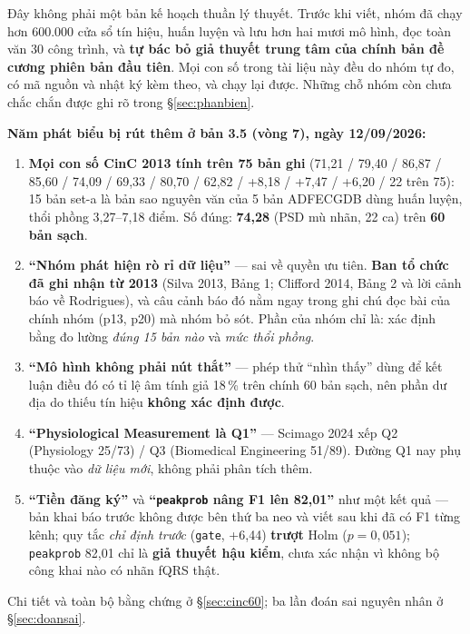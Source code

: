 \documentclass[12pt,a4paper]{article}
\begin{document}
\begin{titlepage}
\vfill

\begin{ghichu}[title={Điểm khác biệt của bản đề cương này}]
\footnotesize
\justifying
Đây không phải một bản kế hoạch thuần lý thuyết. Trước khi viết, nhóm đã chạy hơn 600.000 cửa sổ
tín hiệu, huấn luyện và lưu hơn hai mươi mô hình, đọc toàn văn 30 công trình,
và \textbf{tự bác bỏ giả thuyết trung tâm của chính bản đề cương phiên bản đầu tiên}.
Mọi con số trong tài liệu này đều do nhóm tự đo, có mã nguồn và nhật ký kèm theo, và chạy lại được.
Những chỗ nhóm còn chưa chắc chắn được ghi rõ trong \S\ref{sec:phanbien}.

\smallskip
\textbf{Năm phát biểu bị rút thêm ở bản 3.5 (vòng 7), ngày 12/09/2026:}
\begin{enumerate}[leftmargin=1.4em,itemsep=1pt,topsep=2pt]
\item \textbf{Mọi con số CinC 2013 tính trên 75 bản ghi} (71,21 / 79,40 / 86,87 / 85,60 / 74,09 / 69,33 /
80,70 / 62,82 / +8,18 / +7,47 / +6,20 / 22 trên 75): 15 bản set-a là bản sao nguyên văn của 5 bản ADFECGDB
dùng huấn luyện, thổi phồng 3,27--7,18 điểm. Số đúng: \textbf{74,28} (PSD mù nhãn, 22 ca) trên
\textbf{60 bản sạch}.
\item \textbf{``Nhóm phát hiện rò rỉ dữ liệu''} --- sai về quyền ưu tiên. \textbf{Ban tổ chức đã ghi nhận
từ 2013} (Silva 2013, Bảng 1; Clifford 2014, Bảng 2 và lời cảnh báo về Rodrigues), và câu cảnh báo đó nằm
ngay trong ghi chú đọc bài của chính nhóm (p13, p20) mà nhóm bỏ sót. Phần của nhóm chỉ là: xác định bằng
đo lường \emph{đúng 15 bản nào} và \emph{mức thổi phồng}.
\item \textbf{``Mô hình không phải nút thắt''} --- phép thử ``nhìn thấy'' dùng để kết luận điều đó có tỉ lệ
âm tính giả 18\,\% trên chính 60 bản sạch, nên phần dư địa do thiếu tín hiệu \textbf{không xác định được}.
\item \textbf{``Physiological Measurement là Q1''} --- Scimago 2024 xếp Q2 (Physiology 25/73) / Q3
(Biomedical Engineering 51/89). Đường Q1 nay phụ thuộc vào \emph{dữ liệu mới}, không phải phân tích thêm.
\item \textbf{``Tiền đăng ký''} và \textbf{``\texttt{peakprob} nâng F1 lên 82,01''} như một kết quả --- bản
khai báo trước không được bên thứ ba neo và viết sau khi đã có F1 từng kênh; quy tắc \emph{chỉ định trước}
(\texttt{gate}, +6,44) \textbf{trượt} Holm ($p = 0{,}051$); \texttt{peakprob} 82,01 chỉ là \textbf{giả
thuyết hậu kiểm}, chưa xác nhận vì không bộ công khai nào có nhãn fQRS thật.
\end{enumerate}
Chi tiết và toàn bộ bằng chứng ở \S\ref{sec:cinc60}; ba lần đoán sai nguyên nhân ở \S\ref{sec:doansai}.


\end{ghichu}
\end{titlepage}
\end{document}
